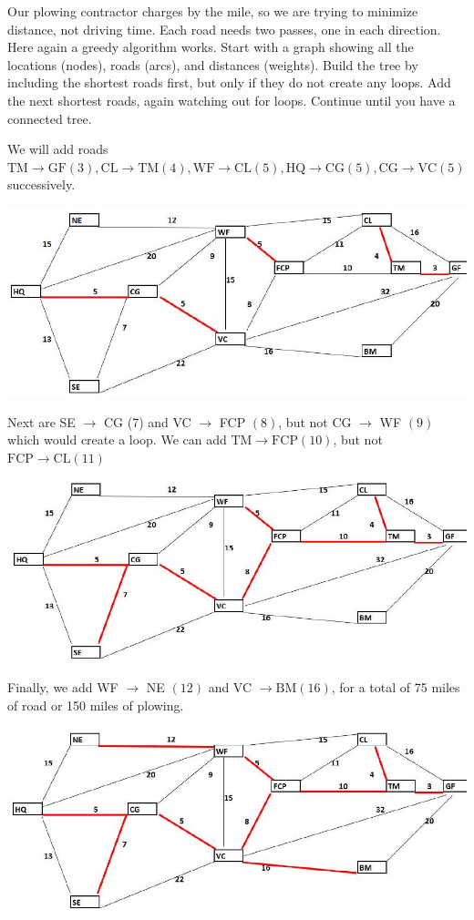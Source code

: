 \documentclass[10pt]{article}
\begin{document}
Our plowing contractor charges by the mile, so we are trying to minimize distance, not driving time. Each road needs two passes, one in each direction. Here again a greedy algorithm works. Start with a graph showing all the locations (nodes), roads (arcs), and distances (weights). Build the tree by including the shortest roads first, but only if they do not create any loops. Add the next shortest roads, again watching out for loops. Continue until you have a connected tree.

We will add roads $\mathrm{TM} \rightarrow \mathrm{GF}(3), \mathrm{CL} \rightarrow \mathrm{TM}(4), \mathrm{WF} \rightarrow \mathrm{CL}(5), \mathrm{HQ} \rightarrow \mathrm{CG}(5), \mathrm{CG} \rightarrow \mathrm{VC}(5)$ successively.

\includegraphics[max width=\textwidth]{2022_07_05_5945264bba2a5f6ba667g-52}

Next are SE $\rightarrow$ CG (7) and VC $\rightarrow$ FCP $(8)$, but not CG $\rightarrow$ WF $(9)$ which would create a loop. We can add $\mathrm{TM} \rightarrow \mathrm{FCP}(10)$, but not $\mathrm{FCP} \rightarrow \mathrm{CL}(11)$

\includegraphics[max width=\textwidth]{2022_07_05_5945264bba2a5f6ba667g-53}

Finally, we add WF $\rightarrow$ NE $(12)$ and VC $\rightarrow \mathrm{BM}(16)$, for a total of 75 miles of road or 150 miles of plowing.

\includegraphics[max width=\textwidth]{2022_07_05_5945264bba2a5f6ba667g-53(1)}
\end{document}
